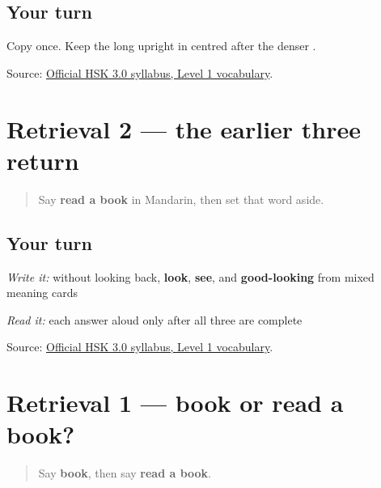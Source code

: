 \subsection*{Your turn}
Copy \textbf{} once. Keep the long upright in  centred after the denser .

\begin{tcolorbox}[breakable,colback=teal!4,colframe=teal!35!black,title={Before you move on}]
Source: \href{https://hsk.cn-bj.ufileos.com/3.0/\%E6\%96\%B0\%E7\%89\%88HSK\%E8\%80\%83\%E8\%AF\%95\%E5\%A4\%A7\%E7\%BA\%B21219.pdf}{Official HSK 3.0 syllabus, Level 1 vocabulary}.
\end{tcolorbox}
\section[Practice]{Retrieval 2 — the earlier three return}

\label{lesson:ZH-R18-looking-three-r2}



\begin{quote}
Say \textbf{read a book} in Mandarin, then set that word aside.
\end{quote}

\subsection*{Your turn}
\emph{Write it:} without looking back, \textbf{look}, \textbf{see}, and \textbf{good-looking} from mixed meaning cards

\emph{Read it:} each answer aloud only after all three are complete

\begin{tcolorbox}[breakable,colback=teal!4,colframe=teal!35!black,title={Before you move on}]
Source: \href{https://hsk.cn-bj.ufileos.com/3.0/\%E6\%96\%B0\%E7\%89\%88HSK\%E8\%80\%83\%E8\%AF\%95\%E5\%A4\%A7\%E7\%BA\%B21219.pdf}{Official HSK 3.0 syllabus, Level 1 vocabulary}.
\end{tcolorbox}
\section[Practice]{Retrieval 1 — book or read a book?}

\label{lesson:ZH-R18-book-reading-r1}



\begin{quote}
Say \textbf{book}, then say \textbf{read a book}.
\end{quote}

